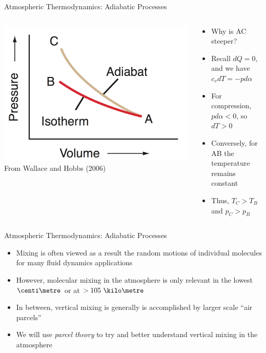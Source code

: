 \begin{frame}{Atmospheric Thermodynamics: Adiabatic Processes}
\begin{columns}[T]
    \begin{column}{.4\textwidth}
    \begin{minipage}[c][0.8\textheight][c]{\linewidth}
    \includegraphics[width=1\textwidth]{fig2}\\
    \centering \small From Wallace and Hobbs (2006)
    \end{minipage}
    \end{column}
    \begin{column}{.6\textwidth}
    \begin{minipage}[c][0.8\textheight][c]{\linewidth}
   \begin{itemize}
   	\item Why is AC steeper?
   	\item Recall $dQ=0$, and we have $c_vdT = -pd\alpha$
   	\item For compression, $pd\alpha<0$, so $dT>0$
   	\item Conversely, for AB the temperature remains constant
   	\item Thus, $T_C>T_B$ and $p_C>p_B$
   \end{itemize}
      \end{minipage}
    \end{column}
  \end{columns} 
\end{frame}
\begin{frame}{Atmospheric Thermodynamics: Adiabatic Processes}
\begin{itemize}
	\item Mixing is often viewed as a result the random motions of individual molecules for many fluid dynamics applications
	\item However, molecular mixing in the atmosphere is only relevant in the lowest $\centi\metre$ or at $>105\ \kilo\metre$
	\item In between, vertical mixing is generally is accomplished by larger scale ``air parcels''
	\item We will use \textit{parcel theory} to try and better understand vertical mixing in the atmosphere
\end{itemize}
\end{frame}
